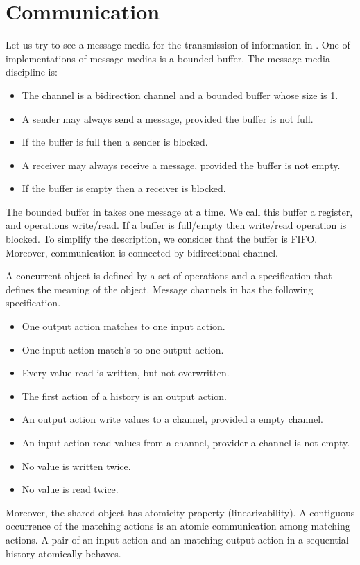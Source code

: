 \documentclass[12pt,a4paper,titlepage]{article}
\theoremstyle{break}
\begin{document}
\section{Communication}
Let us try to see a message media for the transmission of information in \NHK.
One of implementations of message medias is a bounded buffer.
The message media discipline is:
  \begin{itemize}
\item The channel is a bidirection channel and a bounded buffer whose size is 1.
\item A sender may always send a message, provided the buffer is not full.
\item If the buffer is full then a sender is blocked.
\item A receiver may always receive a message, provided the buffer is not empty.
\item If the buffer is empty then a receiver is blocked.
  \end{itemize}
The bounded buffer in \NHK takes one message at a time.
We call this buffer a register, and operations write/read.
If a buffer is full/empty then write/read operation is blocked.
To simplify the description, we consider that the buffer is FIFO.
Moreover, communication is connected by bidirectional channel.

A concurrent object is defined by a set of operations and a specification that defines the meaning of the object.
Message channels in \NHK has the following specification.
  \begin{itemize}
\item One output action matches to one input action.
\item One input action match's to one output action.
\item Every value read is written, but not overwritten.
\item The first action of a history is an output action.
\item An output action write values to a channel, provided a empty channel.
\item An input action read values from a channel, provider a channel is not empty.
\item No value is written twice.
\item No value is read twice.
  \end{itemize}

Moreover, the shared object has atomicity property (linearizability).
A contiguous occurrence of the matching actions is an atomic communication among matching actions.
A pair of an input action and an matching output action in a sequential history atomically behaves.
%
%
\end{document}
